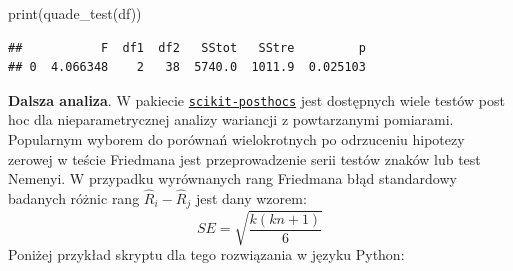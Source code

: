 \documentclass[polish,]{book}
\newenvironment{Shaded}{\begin{snugshade}}{\end{snugshade}}
\newcommand{\BuiltInTok}[1]{#1}
\newcommand{\NormalTok}[1]{#1}
\begin{document}
\begin{Shaded}
\begin{Highlighting}[]
\BuiltInTok{print}\NormalTok{(quade_test(df))}
\end{Highlighting}
\end{Shaded}

\begin{verbatim}
##           F  df1  df2   SStot   SStre         p
## 0  4.066348    2   38  5740.0  1011.9  0.025103
\end{verbatim}

\textbf{Dalsza analiza}. W pakiecie \href{https://scikit-posthocs.readthedocs.io/en/latest/intro/}{\texttt{scikit-posthocs}} jest dostępnych wiele testów post hoc dla nieparametrycznej analizy wariancji z powtarzanymi pomiarami. Popularnym wyborem do porównań wielokrotnych po odrzuceniu hipotezy zerowej w teście Friedmana jest przeprowadzenie serii testów znaków lub test Nemenyi. W przypadku wyrównanych rang Friedmana błąd standardowy badanych różnic rang \(\hat{R}_i-\hat{R}_j\) jest dany wzorem:
\begin{equation}
SE=\sqrt{\frac{k(kn+1)}{6}}
\label{eq:FAR02}
\end{equation}
Poniżej przykład skryptu dla tego rozwiązania w języku Python:
\end{document}
